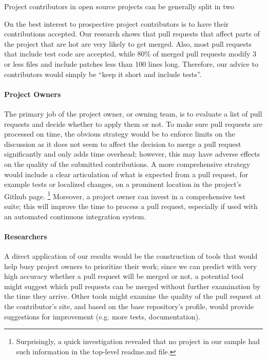 \documentclass{sig-alternate}
\begin{document}
Project contributors in open source projects can be generally split 
in two 

On the best interest to prospective project contributors is to 
have their contributions accepted.
Our research shows that pull requests that affect parts of the project
that are hot are very likely to get merged. Also, most pull requests that
include test code are accepted, while 80\% of merged pull requests modify
3 or less files and include patches less than 100 lines long. Therefore,
our advice to contributors would simply be ``keep it short and include tests''.

\paragraph{Project Owners} The primary job of the project owner, or owning team,
is to evaluate a list of pull requests and decide whether to apply them or not.
To make sure pull requests are processed on time, the obvious strategy would be
to enforce limits on the discussion as it does not seem to affect the decision
to merge a pull request significantly and only adds time overhead; however, this
may have adverse effects on the quality of the submitted contributions. A more
comprehensive strategy would include a clear articulation of what is expected
from a pull request, for example tests or localized changes, on a prominent
location in the project's Github page. \footnote{Surprisingly, a quick
investigation revealed that no project in our sample had such information in
the top-level {\sc readme}.md file.} Moreover, a project owner can invest in a
comprehensive test suite; this will improve the time to process a pull request,
especially if used with an automated continuous integration system.


\paragraph{Researchers}

A direct application of our results would be the construction of tools that
would help busy project owners to prioritize their work; since we can predict
with very high accuracy whether a pull request will be merged or not, a
potential tool might suggest which pull requests can be merged without further
examination by the time they arrive. Other tools might examine the quality of
the pull request at the contributor's site, and based on the base repository's
profile, would provide suggestions for improvement (e.g. more tests,
documentation). 
\end{document}
